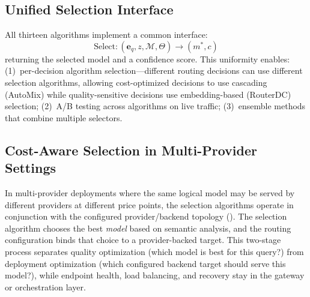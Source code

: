 \subsection{Unified Selection Interface}

All thirteen algorithms implement a common interface:
\begin{equation}
  \text{Select}: (\mathbf{e}_q, z, \mathcal{M}, \Theta) \to (m^*, c)
\end{equation}
returning the selected model and a confidence score.
This uniformity enables:
(1)~per-decision algorithm selection---different routing decisions can use different selection algorithms, allowing cost-optimized decisions to use cascading (AutoMix) while quality-sensitive decisions use embedding-based (RouterDC) selection;
(2)~A/B testing across algorithms on live traffic;
(3)~ensemble methods that combine multiple selectors.

\subsection{Cost-Aware Selection in Multi-Provider Settings}

In multi-provider deployments where the same logical model may be served by different providers at different price points, the selection algorithms operate in conjunction with the configured provider/backend topology ().
The selection algorithm chooses the best \emph{model} based on semantic analysis, and the routing configuration binds that choice to a provider-backed target.
This two-stage process separates quality optimization (which model is best for this query?) from deployment optimization (which configured backend target should serve this model?), while endpoint health, load balancing, and recovery stay in the gateway or orchestration layer.
